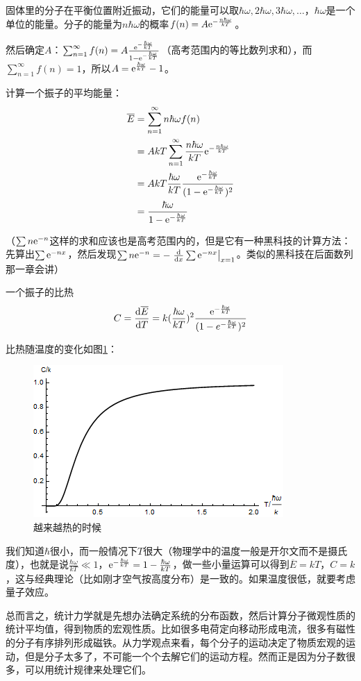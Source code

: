 固体里的分子在平衡位置附近振动，它们的能量可以取$\hbar \omega,2 \hbar \omega,3 \hbar \omega,\dots$，$\hbar \omega$是一个单位的能量。分子的能量为$n \hbar \omega$的概率$f(n)=A \mathrm{e}^{-\frac{n \hbar \omega}{k T}}$。

然后确定$A$：$\sum_{n=1}^\infty f(n)=A \frac{\mathrm{e}^{-\frac{\hbar \omega}{k T}}}{1-\mathrm{e}^{-\frac{\hbar \omega}{k T}}}$（高考范围内的等比数列求和），而$\sum_{n=1}^\infty f(n)=1$，所以$A=\mathrm{e}^{\frac{\hbar \omega}{k T}}-1$。

计算一个振子的平均能量：
\begin{align*}
\overline{E}&=\sum_{n=1}^\infty n \hbar \omega f(n) \\
&=A k T \sum_{n=1}^\infty \frac{n \hbar \omega}{k T} \mathrm{e}^{-\frac{n \hbar \omega}{k T}} \\
&=A k T \frac{\hbar \omega}{k T} \frac{\mathrm{e}^{-\frac{\hbar \omega}{k T}}}{(1-\mathrm{e}^{-\frac{\hbar \omega}{k T}})^2} \\
&=\frac{\hbar \omega}{1-\mathrm{e}^{-\frac{\hbar \omega}{k T}}}
\end{align*}

（$\sum n \mathrm{e}^{-n}$这样的求和应该也是高考范围内的，但是它有一种黑科技的计算方法：先算出$\sum \mathrm{e}^{-n x}$，然后发现$\sum n \mathrm{e}^{-n}=-\left. \frac{\mathop{}\!\mathrm{d}}{\mathop{}\!\mathrm{d} x} \sum \mathrm{e}^{-n x} \right|_{x=1}$。类似的黑科技在后面数列那一章会讲）

一个振子的比热
\begin{equation*}
C=\frac{\mathop{}\!\mathrm{d} \overline{E}}{\mathop{}\!\mathrm{d} T}=k (\frac{\hbar \omega}{k T})^2 \frac{\mathrm{e}^{-\frac{\hbar \omega}{k T}}}{(1-e^{-\frac{\hbar \omega}{k T}})^2}
\end{equation*}

比热随温度的变化如图\ref{fig-quant-osc-c}：
\begin{figure}[htb]
\centering
\includegraphics[scale=0.5]{fig/quant-osc-c}
\caption{越来越热的时候}
\label{fig-quant-osc-c}
\end{figure}

我们知道$\hbar$很小，而一般情况下$T$很大（物理学中的温度一般是开尔文而不是摄氏度），也就是说$\frac{\hbar \omega}{k T} \ll 1$，$\mathrm{e}^{-\frac{\hbar \omega}{k T}}=1-\frac{\hbar \omega}{k T}$，做一些小量运算可以得到$\overline{E}=k T$，$C=k$，这与经典理论（比如刚才空气按高度分布）是一致的。如果温度很低，就要考虑量子效应。

总而言之，统计力学就是先想办法确定系统的分布函数，然后计算分子微观性质的统计平均值，得到物质的宏观性质。比如很多电荷定向移动形成电流，很多有磁性的分子有序排列形成磁铁。从力学观点来看，每个分子的运动决定了物质宏观的运动，但是分子太多了，不可能一个个去解它们的运动方程。然而正是因为分子数很多，可以用统计规律来处理它们。
